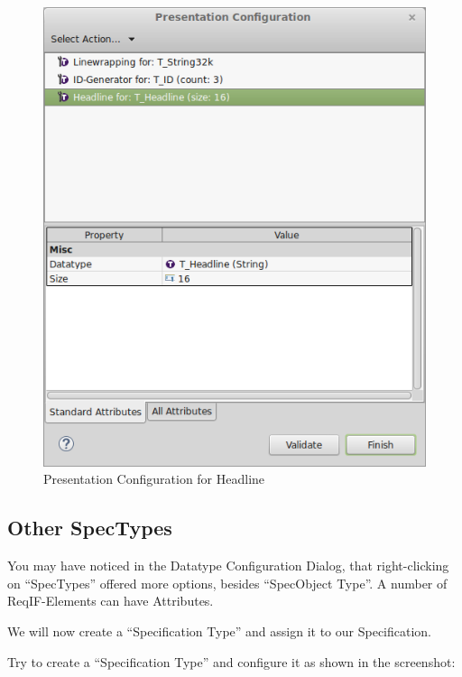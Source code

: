 \begin{figure}[H]
\centering      
\includegraphics[width=0.8\linewidth]{../rmf-images/Presentation_headline.png}      
\caption{Presentation Configuration for Headline}      
\label{fig:headlineConfig2}
\end{figure}

\subsection{Other SpecTypes}

You may have noticed in the Datatype Configuration Dialog, that right-clicking on ``SpecTypes'' offered more options, besides ``SpecObject Type''.  A number of ReqIF-Elements can have Attributes.

We will now create a ``Specification Type'' and assign it to our Specification.

Try to create a ``Specification Type'' and configure it as shown in the screenshot:

